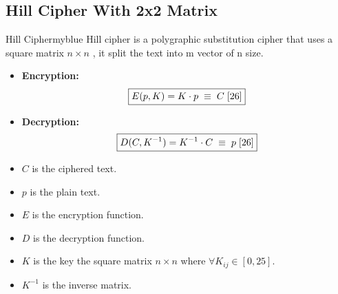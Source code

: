 \newpage


\subsection{Hill Cipher With 2x2 Matrix}
\begin{prettyBox}{Hill Cipher}{myblue}
Hill cipher is a polygraphic substitution cipher that uses a square matrix \(n\times n\) ,
it split the text into m vector of n size.

\begin{itemize}
    \item \textbf{Encryption:}  
        \[\boxed{ E(p, K) = K \cdot p \hspace{0.1cm} \equiv \hspace{0.1cm} C \hspace{0.1cm} [26] }\]
    \item \textbf{Decryption:}  
        \[\boxed{ D(C, K^{-1}) = K^{-1} \cdot C \hspace{0.1cm} \equiv \hspace{0.1cm} p  \hspace{0.1cm} [26] }\]
\end{itemize}

\begin{itemize}
    \item \(C\) is the ciphered text.
    \item \(p\) is the plain text.
    \item \(E\) is the encryption function.
    \item \(D\) is the decryption function.
    \item \(K\) is the key the square matrix \(n\times n\) where \(\forall K_{ij} \in [0,25]\). 
    \item \(K^{-1}\) is the inverse matrix.
\end{itemize}

\end{prettyBox}

\vspace{0.65cm}


